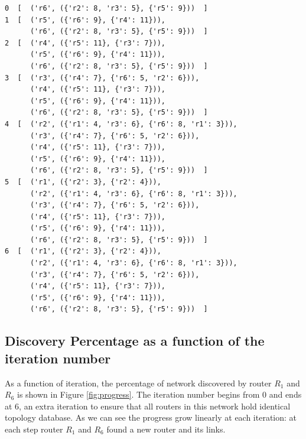 \documentclass[12pt]{article}  %
\theoremstyle{definition}
\theoremstyle{remark}
\begin{document}
\begin{lstlisting}
0  [  ('r6', ({'r2': 8, 'r3': 5}, {'r5': 9}))  ]
1  [  ('r5', ({'r6': 9}, {'r4': 11})),
      ('r6', ({'r2': 8, 'r3': 5}, {'r5': 9}))  ]
2  [  ('r4', ({'r5': 11}, {'r3': 7})),
      ('r5', ({'r6': 9}, {'r4': 11})),
      ('r6', ({'r2': 8, 'r3': 5}, {'r5': 9}))  ]
3  [  ('r3', ({'r4': 7}, {'r6': 5, 'r2': 6})),
      ('r4', ({'r5': 11}, {'r3': 7})),
      ('r5', ({'r6': 9}, {'r4': 11})),
      ('r6', ({'r2': 8, 'r3': 5}, {'r5': 9}))  ]
4  [  ('r2', ({'r1': 4, 'r3': 6}, {'r6': 8, 'r1': 3})),
      ('r3', ({'r4': 7}, {'r6': 5, 'r2': 6})),
      ('r4', ({'r5': 11}, {'r3': 7})),
      ('r5', ({'r6': 9}, {'r4': 11})),
      ('r6', ({'r2': 8, 'r3': 5}, {'r5': 9}))  ]
5  [  ('r1', ({'r2': 3}, {'r2': 4})),
      ('r2', ({'r1': 4, 'r3': 6}, {'r6': 8, 'r1': 3})),
      ('r3', ({'r4': 7}, {'r6': 5, 'r2': 6})),
      ('r4', ({'r5': 11}, {'r3': 7})),
      ('r5', ({'r6': 9}, {'r4': 11})),
      ('r6', ({'r2': 8, 'r3': 5}, {'r5': 9}))  ]
6  [  ('r1', ({'r2': 3}, {'r2': 4})),
      ('r2', ({'r1': 4, 'r3': 6}, {'r6': 8, 'r1': 3})),
      ('r3', ({'r4': 7}, {'r6': 5, 'r2': 6})),
      ('r4', ({'r5': 11}, {'r3': 7})),
      ('r5', ({'r6': 9}, {'r4': 11})),
      ('r6', ({'r2': 8, 'r3': 5}, {'r5': 9}))  ]
\end{lstlisting}

\subsection{Discovery Percentage as a function of the iteration number}
As a function of iteration, the percentage of network discovered by router $R_1$ and $R_6$ is shown in Figure \ref{fig:progress}.
The iteration number begins from 0 and ends at 6, an extra iteration to ensure that all routers in this network hold identical topology database.
As we can see the progress grow linearly at each iteration: at each step router $R_1$ and $R_6$ found a new router and its links.
\end{document}
